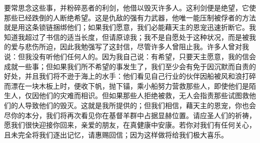 要常思念这些事，并粉碎恶者的利剑，他借以毁灭许多人。这利剑便是绝望，它使那些已经跌倒的人断绝希望。这是仇敌的强有力武器，他唯一能压制被俘者的方法就是用这条锁链捆绑他们；如果我们愿意，我们必能藉天主的恩宠迅速折断它。我知道我超过了书信的适当长度，但请原谅我；我不是自愿处于这种状况，而是被我的爱与悲伤所迫，因此我勉强写了这封信，尽管许多人曾阻止我。许多人曾对我说：但我没有听他们任何人的。因为我自己说：有希望，只要天主愿意，我的信会成就一些事；但如果我们所不希望的事发生了，我们至少会有免于因沉默而自责的好处，并且我们将不逊于海上的水手：他们看见自己行业的伙伴因船被风和浪打碎而漂在一块木板上时，便收下帆，抛下锚，乘小船努力营救那些人，即使他们是陌生人，仅因他们的灾难而相识。但如果那些人拒绝被救，无人会指责那些试图救他们的人导致他们的毁灭。这就是我所提供的；但我们相信，藉天主的恩宠，你也会尽你的本分，我们将再次看见你在基督羊群中占据显赫位置。请应圣人们的祈祷，愿我们很快迎接你回来，亲爱的朋友，在真健康中安康。若你对我们有任何关心，且未完全将我们逐出记忆，请惠赐回信；因为这样做将给我们极大喜乐。\par

